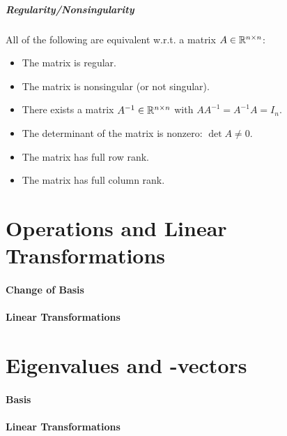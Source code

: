 			\subparagraph{Regularity/Nonsingularity}
				All of the following are equivalent w.r.t. a matrix \( A \in \mathbb{R}^{n \times n} \):
				\begin{itemize}
					\item The matrix is regular.
					\item The matrix is nonsingular (or not singular).
					\item There exists a matrix \( A^{-1} \in \mathbb{R}^{n \times n} \) with \( AA^{-1} = A^{-1}A = I_n \).
					\item The determinant of the matrix is nonzero: \( \det A \neq 0 \).
					\item The matrix has full row rank.
					\item The matrix has full column rank.
				\end{itemize}

	\section{Operations and Linear Transformations} %

		\paragraph{Change of Basis} %

		\paragraph{Linear Transformations} %

	\section{Eigenvalues and -vectors} %

		\paragraph{Basis} %

		\paragraph{Linear Transformations} %

